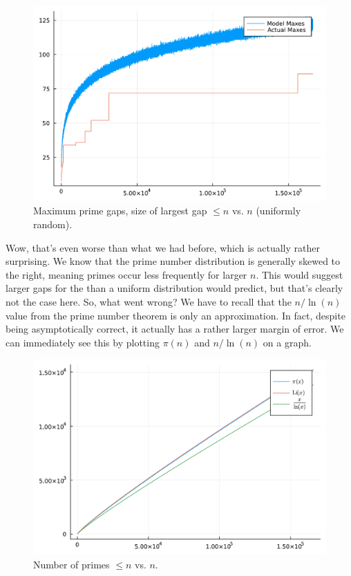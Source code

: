 \documentclass[conference]{IEEEtran}
\begin{document}
\begin{figure}[H]
  \centering
  \includegraphics[width=\linewidth,keepaspectratio]{random-plot-with-reals.pdf}
  \caption{Maximum prime gaps, size of largest gap $\le n$ vs. $n$ (uniformly random).}
\end{figure}

Wow, that's even worse than what we had before, which is actually rather surprising.
We know that the prime number distribution is generally skewed to the right, meaning
primes occur less frequently for larger $n$. This would suggest larger gaps for the
than a uniform distribution would predict, but that's clearly not the case here. So,
what went wrong? We have to recall that the $n/\ln(n)$ value
from the prime number theorem is only an approximation. In fact, despite being
asymptotically correct, it actually has a rather larger margin of error. We
can immediately see this by plotting $\pi(n)$ and $n/\ln(n)$ on a graph.

\begin{figure}[H]
  \centering
  \includegraphics[width=\linewidth,keepaspectratio]{pmt_comparison.pdf}
  \caption{Number of primes $\le n$ vs. $n$.}
\end{figure}
\end{document}
